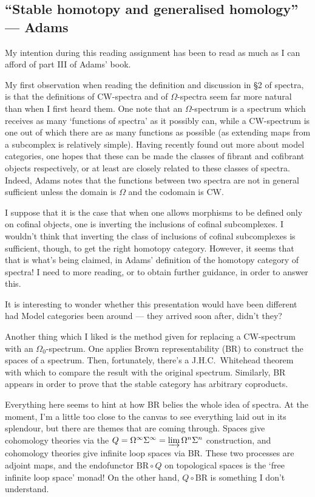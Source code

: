 \documentclass[11pt]{article}
\newcommand{\KanSemResponse}[1]
{
\thispagestyle{fancy}
\section{#1}
}
\begin{document}
\begin{AdamsStableHtpy}
\KanSemResponse
{``Stable homotopy and generalised homology'' --- Adams}
My intention during this reading assignment has been to read as much as I can afford of part III of Adams' book.

My first observation when reading the definition and discussion in \S2 of spectra, is that the definitions of CW-spectra and of $\Omega$-spectra seem far more natural than when I first heard them. One note that an $\Omega$-spectrum is a spectrum which receives as many `functions of spectra' as it possibly can, while a CW-spectrum is one out of which there are as many functions as possible (as extending maps from a subcomplex is relatively simple). Having recently found out more about model categories, one hopes that these can be made the classes of fibrant and cofibrant objects respectively, or at least are closely related to these classes of spectra. Indeed, Adams notes that the functions between two spectra are not in general sufficient unless the domain is $\Omega$ and the codomain is CW.

I suppose that it is the case that when one allows morphisms to be defined only on cofinal objects, one is inverting the inclusions of cofinal subcomplexes. I wouldn't think that inverting the class of inclusions of cofinal subcomplexes is sufficient, though, to get the right homotopy category. However, it seems that that is what's being claimed, in Adams' definition of the homotopy category of spectra! I need to more reading, or to obtain further guidance, in order to answer this.

It is interesting to wonder whether this presentation would have been different had Model categories been around --- they arrived soon after, didn't they? 

Another thing which I liked is the method given for replacing a CW-spectrum with an $\Omega_0$-spectrum. One applies Brown representability (BR) to construct the spaces of a spectrum. Then, fortunately, there's a J.H.C.\ Whitehead theorem with which to compare the result with the original spectrum. Similarly, BR appears in order to prove that the stable category has arbitrary coproducts. 

Everything here seems to hint at how BR belies the whole idea of spectra. At the moment, I'm a little too close to the canvas to see everything laid out in its splendour, but there are themes that are coming through. Spaces give cohomology theories via the $Q=\Omega^\infty\Sigma^\infty=\varinjlim \Omega^n\Sigma^n$ construction, and cohomology theories give infinite loop spaces via BR. These two processes are adjoint maps, and the endofunctor $\text{BR}\circ Q$ on topological spaces is the `free infinite loop space' monad! On the other hand, $Q\circ\text{BR}$ is something I don't understand.


\end{AdamsStableHtpy}
\end{document}
